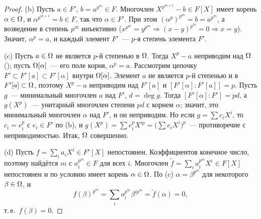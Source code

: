 \begin{proof}
(b) Пусть $a\in F'$, $b=a^{p^m}\in F$. Многочлен $X^{p^{m+1}}-b\in F[X]$ имеет корень $\alpha\in\Omega$, и
$\alpha^{p^{m+1}}=b\in F$, так что $\alpha\in F'$. При этом $(\alpha^p)^{p^m}=b=a^{p^m}$, а возведение в степень
$p^m$ инъективно ($x^{p^m}=y^{p^m}\Rightarrow(x-y)^{p^m}=0\Rightarrow x=y$). Значит, $\alpha^p=a$, и каждый элемент $F'$~---
$p$-я степень элемента $F'$.

(c) Пусть $a\in\Omega$ не является $p$-й степенью в $\Omega$. Тогда $X^p-a$ неприводим над $\Omega$ (); пусть
$\Omega[\alpha]$~--- его поле корня, $\alpha^p=a$. Рассмотрим цепочку $F'\subset F'[a]\subset F'[\alpha]$ внутри $\Omega[\alpha]$.
Элемент $a$ не является $p$-й степенью и в $F'[a]\subset\Omega$, поэтому $X^p-a$ неприводим над $F'[a]$ и
$[F'[\alpha]:F'[a]]=p$. Пусть $g$~--- минимальный многочлен $a$ над $F'$, $d=\deg g$. Тогда $[F'[\alpha]:F']=pd$, а
$g(X^p)$~--- унитарный многочлен степени $pd$ с корнем $\alpha$; значит, это минимальный многочлен $\alpha$ над $F'$, и
он неприводим. Но если $g=\sum c_iX^i$, то $c_i=e_i^p$ с $e_i\in F'$ по (b), и
$g(X^p)=\sum e_i^pX^{ip}=\bigl(\sum e_iX^i\bigr)^p$~--- противоречие с неприводимостью. Итак, $\Omega$ совершенно.

\begin{center}
\end{center}

(d) Пусть $f=\sum_ia_iX^i\in F'[X]$ непостоянен. Коэффициентов конечное число, поэтому найдётся $m$ с $a_i^{p^m}\in F$
для всех $i$. Многочлен $\tilde f=\sum_ia_i^{p^m}X^i\in F[X]$ непостоянен и по условию имеет корень $\alpha\in\Omega$. По
(c) $\alpha=\beta^{p^m}$ для некоторого $\beta\in\Omega$, и
\[
f(\beta)^{p^m}=\sum_ia_i^{p^m}\beta^{ip^m}=\tilde f(\alpha)=0,
\]
т.\,е.\ $f(\beta)=0$.
\end{proof}

